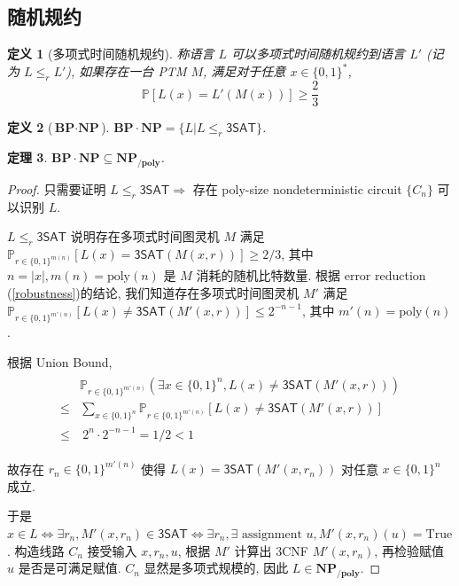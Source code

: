 \documentclass[8pt]{article}
\theoremstyle{compact}
\newtheorem{theorem}{定理}[section]
\newtheorem{definition}[theorem]{定义}
\def\le{\leqslant}
\def\ge{\geqslant}
\begin{document}
\subsection{随机规约}
\begin{definition}[多项式时间随机规约]
	称语言 $L$ 可以多项式时间随机规约到语言 $L'$ (记为 $L \le_r L'$), 如果存在一台 PTM $M$, 满足对于任意 $x \in \{0, 1\}^*$, $$\mathbb P[L(x) = L'(M(x))] \ge \frac23$$
\end{definition}
\begin{definition}[$\textbf{BP} \cdot \textbf{NP}$]
	$\textbf{BP} \cdot \textbf{NP} = \{L | L \le_r \textsf{3SAT}\}$.
\end{definition}
\begin{theorem}
	$\textbf{BP} \cdot \textbf{NP} \subseteq \textbf{NP}_{\textbf{/poly}}$.
\end{theorem}
\begin{proof}
	只需要证明 $L \le_r \textsf{3SAT} \Rightarrow $ 存在 poly-size nondeterministic circuit $\{C_n\}$ 可以识别 $L$.

$L \le_r \textsf{3SAT}$ 说明存在多项式时间图灵机 $M$ 满足 $\mathbb P_{r \in \{0, 1\}^{m(n)}}[L(x) = \textsf{3SAT}(M(x, r))] \ge 2/3$, 其中 $n = |x|, m(n) = \text{poly}(n)$ 是 $M$ 消耗的随机比特数量. 根据 error reduction (\cref{robustness})的结论, 我们知道存在多项式时间图灵机 $M'$ 满足 $\mathbb P_{r \in \{0, 1\}^{m'(n)}}[L(x) \neq \textsf{3SAT}(M'(x, r))] \le 2^{-n-1}$, 其中 $m'(n) = \text{poly}(n)$.

根据 Union Bound, \begin{align*}
	\begin{split}
		&\mathbb P_{r \in \{0, 1\}^{m'(n)}} \left(\exists x \in \{0, 1\}^n, L(x) \neq \textsf{3SAT}(M'(x, r))\right) \\
		\le & \sum_{x \in \{0, 1\}^n}\mathbb P_{r \in \{0, 1\}^{m'(n)}}[L(x) \neq \textsf{3SAT}(M'(x, r))] \\
		\le & \ 2^n \cdot 2^{-n-1} = 1/2 < 1
	\end{split}
\end{align*}

故存在 $r_n \in \{0, 1\}^{m'(n)}$ 使得 $L(x) = \textsf{3SAT}(M'(x, r_n))$ 对任意 $x \in \{0, 1\}^n$ 成立.

于是 $x \in L \Leftrightarrow \exists r_n, M'(x, r_n) \in \textsf{3SAT} \Leftrightarrow \exists r_n, \exists \text{ assignment } u, M'(x, r_n)(u) = \text{True}$. 构造线路 $C_n$ 接受输入 $x, r_n, u$, 根据 $M'$ 计算出 3CNF $M'(x, r_n)$, 再检验赋值 $u$ 是否是可满足赋值. $C_n$ 显然是多项式规模的, 因此 $L \in \textbf{NP}_{\textbf{/poly}}$.
\end{proof}
\end{document}
